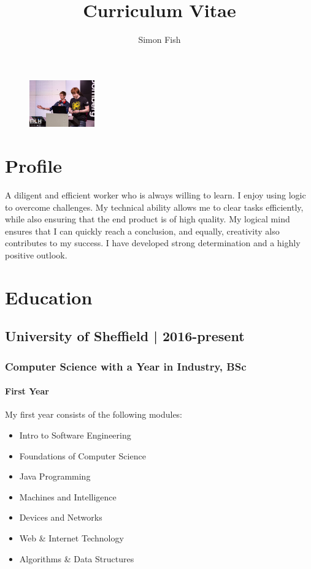 \documentclass{article}
\begin{document}
\title{Curriculum Vitae}
\author{Simon Fish}

\begin{figure}
	\centering
	\includegraphics[width=0.25\textwidth]{profile}
\end{figure}

\section*{Profile}
A diligent and efficient worker who is always willing to learn. I enjoy using logic to
overcome challenges. My technical ability allows me to clear tasks efficiently,
while also ensuring that the end product is of high quality. My logical mind
ensures that I can quickly reach a conclusion, and equally, creativity also
contributes to my success. I have developed strong determination and a highly
positive outlook.

\section*{Education}
\subsection*{University of Sheffield | 2016-present}
\subsubsection*{Computer Science with a Year in Industry, BSc}
\paragraph{First Year}
My first year consists of the following modules:
\begin{multicols}{2}
	\begin{itemize}
		\item Intro to Software Engineering
		\item Foundations of Computer Science
		\item Java Programming
		\item Machines and Intelligence
		\item Devices and Networks
		\item Web \& Internet Technology
		\item Algorithms \& Data Structures
	\end{itemize}
\end{multicols}
\end{document}
